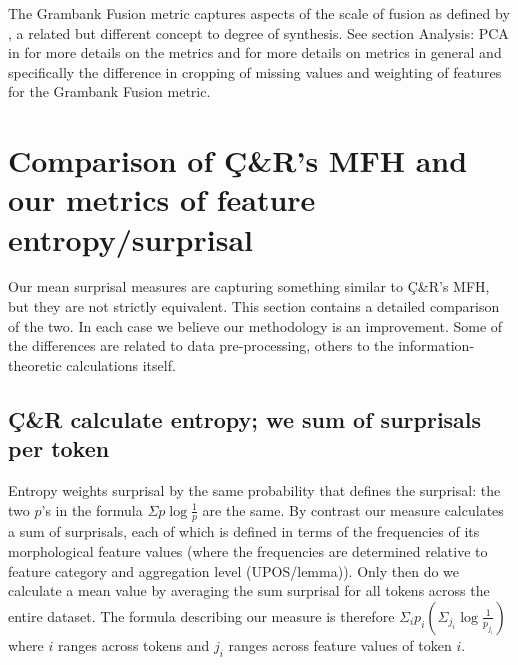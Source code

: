 \documentclass[USenglish]{article}
\begin{document}
The Grambank Fusion metric captures aspects of the scale of fusion as defined by \citep{bickel_inflectional_2007}, a related but different concept to degree of synthesis.
See section Analysis: PCA in \citet{skirgard_grambank_2023-1} for more details on the metrics and \citet{skirgard_aggregate_2025} for more details on metrics in general and specifically the difference in cropping of missing values and weighting of features for the Grambank Fusion metric. 

\FloatBarrier
\newpage
\section{Comparison of Ç\&R's MFH and our metrics of feature entropy/surprisal}\label{sec:appendixComparison}

Our mean surprisal measures are capturing something similar to Ç\&R's MFH, but they are not strictly equivalent.
This section contains a detailed comparison of the two.
In each case we believe our methodology is an improvement.
Some of the differences are related to data pre-processing, others to the information-theoretic calculations itself.

\subsection{Ç\&R calculate entropy; we sum of surprisals per token}\label{appedix:differences_entropy_vs_surprisal}
Entropy weights surprisal by the same probability that defines the surprisal: the two $p$'s in the formula $\Sigma p\log{\frac{1}{p}}$ are the same.
By contrast our measure calculates a sum of surprisals, each of which is defined in terms of the frequencies of its morphological feature values (where the frequencies are determined relative to feature category and aggregation level (UPOS/lemma)).
Only then do we calculate a mean value by averaging the sum surprisal for all tokens across the entire dataset.
The formula describing our measure is therefore $\Sigma_i p_i \left( \Sigma_{j_i} \log{\frac{1}{p_{j_i}}} \right)$ where $i$ ranges across tokens and $j_i$ ranges across feature values of token $i$.

\end{document}
